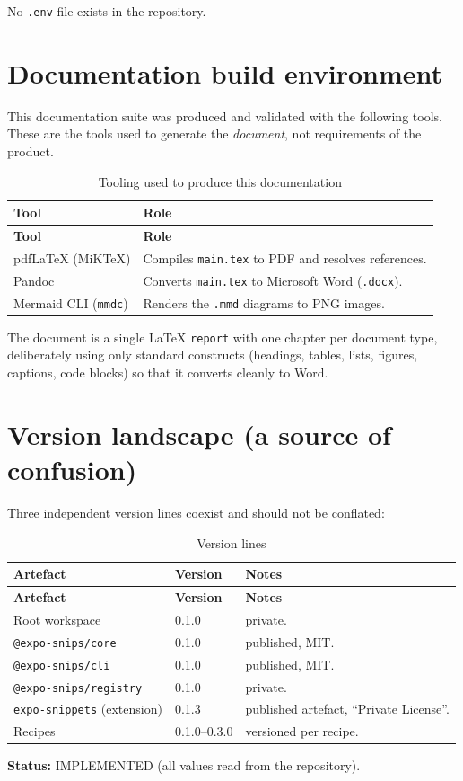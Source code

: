 No \texttt{.env} file exists in the repository.

\section{Documentation build environment}

This documentation suite was produced and validated with the following tools.
These are the tools used to generate the \emph{document}, not requirements of
the product.

\begin{longtable}{@{}L{4.6cm}L{9.6cm}@{}}
\caption{Tooling used to produce this documentation}\\
\toprule
\textbf{Tool} & \textbf{Role} \\
\midrule
\endfirsthead
\toprule
\textbf{Tool} & \textbf{Role} \\
\midrule
\endhead
pdfLaTeX (MiKTeX) & Compiles \texttt{main.tex} to PDF and resolves references. \\
Pandoc & Converts \texttt{main.tex} to Microsoft Word (\texttt{.docx}). \\
Mermaid CLI (\texttt{mmdc}) & Renders the \texttt{.mmd} diagrams to PNG images. \\
\bottomrule
\end{longtable}

The document is a single \LaTeX{} \texttt{report} with one chapter per document
type, deliberately using only standard constructs (headings, tables, lists,
figures, captions, code blocks) so that it converts cleanly to Word.

\section{Version landscape (a source of confusion)}

Three independent version lines coexist and should not be conflated:

\begin{longtable}{@{}L{5cm}L{2.6cm}L{6.6cm}@{}}
\caption{Version lines}\\
\toprule
\textbf{Artefact} & \textbf{Version} & \textbf{Notes} \\
\midrule
\endfirsthead
\toprule
\textbf{Artefact} & \textbf{Version} & \textbf{Notes} \\
\midrule
\endhead
Root workspace & 0.1.0 & private. \\
\texttt{@expo-snips/core} & 0.1.0 & published, MIT. \\
\texttt{@expo-snips/cli} & 0.1.0 & published, MIT. \\
\texttt{@expo-snips/registry} & 0.1.0 & private. \\
\texttt{expo-snippets} (extension) & 0.1.3 & published artefact, ``Private
License''. \\
Recipes & 0.1.0--0.3.0 & versioned per recipe. \\
\bottomrule
\end{longtable}

\textbf{Status:} IMPLEMENTED (all values read from the repository).
